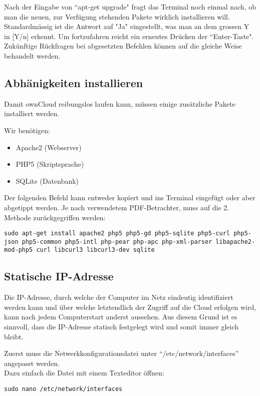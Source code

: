 Nach der Eingabe von ``apt-get upgrade" fragt das Terminal noch einmal nach, ob man die neuen, zur Verfügung stehenden Pakete wirklich installieren will. Standardmässig ist die Antwort auf "Ja" eingestellt, was man an dem grossen Y in [Y/n] erkennt. Um fortzufahren reicht ein erneutes Drücken der ``Enter-Taste". Zukünftige Rückfragen bei abgesetzten Befehlen können auf die gleiche Weise behandelt werden.

\subsection{Abhänigkeiten installieren}
Damit ownCloud reibungslos laufen kann, müssen einige zusätzliche Pakete installiert werden.

Wir benötigen: 
\begin{itemize}
\item Apache2 (Webserver)
\item PHP5 (Skriptsprache)
\item SQLite (Datenbank)
\end{itemize}

Der folgenden Befehl kann entweder kopiert und ins Terminal eingefügt oder aber abgetippt werden. Je nach verwendetem PDF-Betrachter, muss auf die 2. Methode zurückgegriffen werden:

\begin{lstlisting}
sudo apt-get install apache2 php5 php5-gd php5-sqlite php5-curl php5-json php5-common php5-intl php-pear php-apc php-xml-parser libapache2-mod-php5 curl libcurl3 libcurl3-dev sqlite
\end{lstlisting}

\subsection{Statische IP-Adresse}
Die IP-Adresse, durch welche der Computer im Netz eindeutig identifiziert werden kann und über welche letztendlich der Zugriff auf die Cloud erfolgen wird, kann nach jedem Computerstart anderst aussehen.
Aus diesem Grund ist es sinnvoll, dass die IP-Adresse statisch festgelegt wird und somit immer gleich bleibt.

Zuerst muss die Netwerkkonfigurationsdatei unter ``/etc/network/interfaces'' angepasst werden.
\\
Dazu einfach die Datei mit einem Texteditor öffnen:

\begin{lstlisting}
sudo nano /etc/network/interfaces
\end{lstlisting} 

